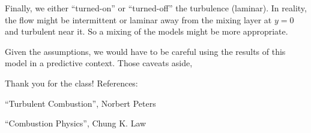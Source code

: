 \documentclass{article}
\begin{document}
Finally, we either ``turned-on'' or ``turned-off'' the turbulence (laminar). In reality, the flow
might be intermittent or laminar away from the mixing layer at $y=0$ and turbulent near it. 
So a mixing of the models might be more appropriate. 

Given the assumptions, we would have to be careful using the results of 
this model in a predictive context. Those caveats aside, 

\newpage

Thank you for the class! 
\vspace{1in}
\newline
References:

``Turbulent Combustion'', Norbert Peters

``Combustion Physics'', Chung K. Law
\end{document}
